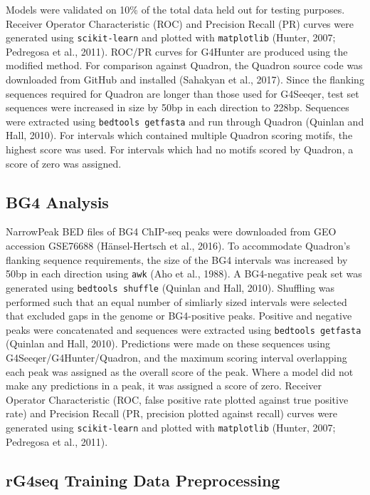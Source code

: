 \documentclass[12pt,a4paper,]{report}
\begin{document}
Models were validated on 10\% of the total data held out for testing
purposes. Receiver Operator Characteristic (ROC) and Precision Recall
(PR) curves were generated using \texttt{scikit-learn} and plotted with
\texttt{matplotlib} (Hunter, 2007; Pedregosa et al., 2011). ROC/PR
curves for G4Hunter are produced using the modified method. For
comparison against Quadron, the Quadron source code was downloaded from
GitHub and installed (Sahakyan et al., 2017). Since the flanking
sequences required for Quadron are longer than those used for G4Seeqer,
test set sequences were increased in size by 50bp in each direction to
228bp. Sequences were extracted using \texttt{bedtools\ getfasta} and
run through Quadron (Quinlan and Hall, 2010). For intervals which
contained multiple Quadron scoring motifs, the highest score was used.
For intervals which had no motifs scored by Quadron, a score of zero was
assigned.

\hypertarget{bg4-analysis}{%
\subsection{BG4 Analysis}\label{bg4-analysis}}

NarrowPeak BED files of BG4 ChIP-seq peaks were downloaded from GEO
accession GSE76688 (Hänsel-Hertsch et al., 2016). To accommodate
Quadron's flanking sequence requirements, the size of the BG4 intervals
was increased by 50bp in each direction using \texttt{awk} (Aho et al.,
1988). A BG4-negative peak set was generated using
\texttt{bedtools\ shuffle} (Quinlan and Hall, 2010). Shuffling was
performed such that an equal number of simliarly sized intervals were
selected that excluded gaps in the genome or BG4-positive peaks.
Positive and negative peaks were concatenated and sequences were
extracted using \texttt{bedtools\ getfasta} (Quinlan and Hall, 2010).
Predictions were made on these sequences using
G4Seeqer/G4Hunter/Quadron, and the maximum scoring interval overlapping
each peak was assigned as the overall score of the peak. Where a model
did not make any predictions in a peak, it was assigned a score of zero.
Receiver Operator Characteristic (ROC, false positive rate plotted
against true positive rate) and Precision Recall (PR, precision plotted
against recall) curves were generated using \texttt{scikit-learn} and
plotted with \texttt{matplotlib} (Hunter, 2007; Pedregosa et al., 2011).

\hypertarget{rg4seq-training-data-preprocessing}{%
\subsection{rG4seq Training Data
Preprocessing}\label{rg4seq-training-data-preprocessing}}
\end{document}
